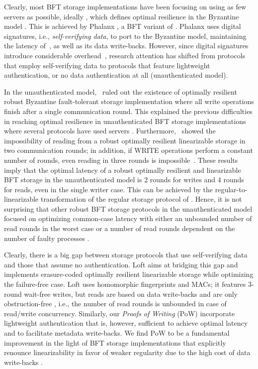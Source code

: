 \documentclass[10pt,conference,compsocconf]{IEEEtran}
\begin{document}
Clearly, most BFT storage implementations have been focusing on using as few servers as possible, ideally , which defines optimal resilience in the Byzantine model \cite{MAD02}. This is achieved by Phalanx \cite{Phalanx}, a BFT variant of \cite{ABND95}. Phalanx uses digital signatures, i.e., \emph{self-verifying data}, to port \cite{ABND95} to the Byzantine model, maintaining the latency of~\cite{ABND95}, as well as its data write-backs. However, since digital signatures introduce considerable overhead~\cite{Rei94,MR97}, research attention has shifted from protocols that employ self-verifying data \cite{Phalanx, MR98, CT06, LR06} to protocols that feature lightweight authentication, or no data authentication at all (unauthenticated model).

In the unauthenticated model,~\cite{ACKM06} ruled out the existence of optimally resilient robust Byzantine fault-tolerant storage implementation where all write operations finish after a single communication round. This explained the previous difficulties in reaching optimal resilience in unauthenticated BFT storage implementations where several protocols have used  servers \cite{GWGR04,BD04}. Furthermore,~\cite{DGM11} showed the impossibility of reading from a robust optimally resilient linearizable storage in two communication rounds; in addition, if \textsc{WRITE} operations perform a constant number of rounds, even reading in three rounds is impossible~\cite{DGM11}. These results imply that the optimal latency of a robust optimally resilient and linearizable BFT storage in the unauthenticated model is 2 rounds for writes and 4 rounds for reads, even in the single writer case. This can be achieved by the regular-to-linearizable transformation of the regular \cite{Lam86} storage protocol of \cite{GV06}. Hence, it is not surprising that other robust BFT storage protocols in the unauthenticated model focused on optimizing common-case latency with either an unbounded number of read rounds in the worst case \cite{GLV06,GV10} or a number of read rounds dependent on the number of faulty processes  \cite{MAD02,AAB07}.


Clearly, there is a big gap between storage protocols that use self-verifying data and those that assume no authentication. Loft \cite{HendricksGR07} aims at bridging this gap and implements erasure-coded optimally resilient linearizable storage  while optimizing the failure-free case. Loft uses homomorphic fingerprints and MACs; it features 3-round wait-free writes, but reads are based on data write-backs and are only obstruction-free \cite{HLM03}, i.e., the number of read rounds is unbounded in case of read/write concurrency. Similarly, our \emph{Proofs of Writing} (PoW) incorporate lightweight authentication that is, however, sufficient to achieve optimal latency and to facilitate metadata write-backs. We find PoW to be a fundamental improvement in the light of BFT storage implementations that explicitly renounce linearizability in favor of weaker regularity due to the high cost of data write-backs \cite{BessaniCQAS11}.
\end{document}
